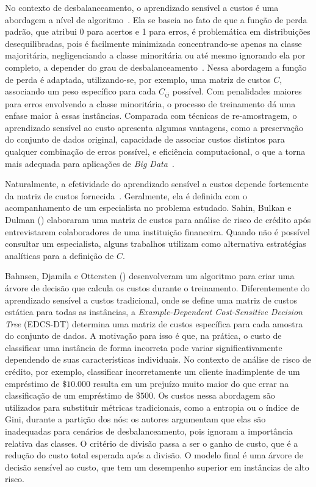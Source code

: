 No contexto de desbalanceamento, o aprendizado sensível a custos é uma abordagem a nível de algoritmo~\cite{Krawczyk2016}. Ela se baseia no fato de que a função de perda padrão, que atribui 0 para acertos e 1 para erros, é problemática em distribuições desequilibradas, pois é facilmente minimizada concentrando-se apenas na classe majoritária, negligenciando a classe minoritária ou até mesmo ignorando ela por completo, a depender do grau de desbalanceamento~\cite{Landgrebe2004}. Nessa abordagem a função de perda é adaptada, utilizando-se, por exemplo, uma matriz de custos \(C\), associando um peso específico para cada \(C_{ij}\) possível. Com penalidades maiores para erros envolvendo a classe minoritária, o processo de treinamento dá uma enfase maior à essas instâncias. Comparada com técnicas de re-amostragem, o aprendizado sensível ao custo apresenta algumas vantagens, como a preservação do conjunto de dados original, capacidade de associar custos distintos para qualquer combinação de erros possível, e eficiência computacional, o que a torna mais adequada para aplicações de \textit{Big Data}~\cite{Haixiang2017}.

Naturalmente, a efetividade do aprendizado sensível a custos depende fortemente da matriz de custos fornecida~\cite{FernndezCs2018}. Geralmente, ela é definida com o acompanhamento de um especialista no problema estudado. Sahin, Bulkan e Dulman (\citeyear{Sahin2013}) elaboraram uma matriz de custos para análise de risco de crédito após entrevistarem colaboradores de uma instituição financeira. Quando não é possível consultar um especialista, alguns trabalhos utilizam como alternativa estratégias analíticas para a definição de \(C\).

Bahnsen, Djamila e Ottersten (\citeyear{Bahnsen2015}) desenvolveram um algoritmo para criar uma árvore de decisão que calcula os custos durante o treinamento. Diferentemente do aprendizado sensível a custos tradicional, onde se define uma matriz de custos estática para todas as instâncias, a \textit{Example-Dependent Cost-Sensitive Decision Tree} (EDCS-DT) determina uma matriz de custos específica para cada amostra do conjunto de dados. A motivação para isso é que, na prática, o custo de classificar uma instância de forma incorreta pode variar significativamente dependendo de suas características individuais. No contexto de análise de risco de crédito, por exemplo, classificar incorretamente um cliente inadimplente de um empréstimo de $\$10.000$ resulta em um prejuízo muito maior do que errar na classificação de um empréstimo de $\$500$. Os custos nessa abordagem são utilizados para substituir métricas tradicionais, como a entropia ou o índice de Gini, durante a partição dos nós: os autores argumentam que elas são inadequadas para cenários de desbalanceamento, pois ignoram a importância relativa das classes. O critério de divisão passa a ser o ganho de custo, que é a redução do custo total esperada após a divisão. O modelo final é uma árvore de decisão sensível ao custo, que tem um desempenho superior em instâncias de alto risco.

